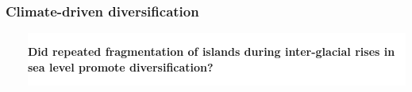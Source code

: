 {
\begin{frame}
    \frametitle{Climate-driven diversification}    
    \begin{columns}
        \ \\


        \vspace{-2cm}

        \colorbox{white}{
            \begin{minipage}[t]{1.0\textwidth}
                \raggedright
                \textbf{Did repeated fragmentation of islands during
                    inter-glacial rises in sea level promote diversification?}
            \end{minipage}
        }
    \end{columns}
\end{frame}
}

